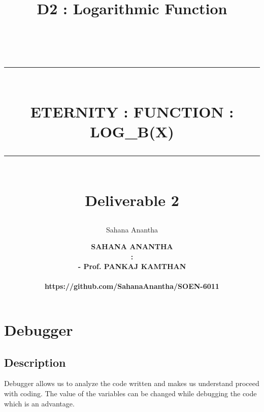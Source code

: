\documentclass[12pt]{report}
\title{D2 : Logarithmic Function}
\author{Sahana Anantha}
\date{}
\newcommand{\HRule}[1]{\rule{\linewidth}{#1}}
\begin{document}
\title{ \Large {}
		\\ [2.0cm]
		\HRule{2pt} \\ [0.5cm]
		\LARGE \textbf{\uppercase{ETERNITY : function : log_{b}(x)}}\\
		\HRule{2pt} \\ [0.5cm]
		\textbf{{\Large Deliverable 2}}\\
		\normalsize  \vspace*{5\baselineskip}}

\date{}
\author{\LARGE \textbf{
		SAHANA ANANTHA \\
		\Large {} : \\
        \Large {} - Prof. PANKAJ KAMTHAN  \\
\Large {}\\
\small \text  https://github.com/SahanaAnantha/SOEN-6011 \\}}

\maketitle


\renewcommand{\thesection}{\arabic{section}}
\section{Debugger}
\subsection{Description}
Debugger allows us to analyze the code written and makes us understand proceed with coding. The value of the variables can be changed while debugging the code which is an advantage.
\end{document}
